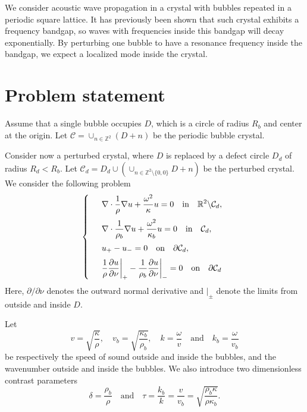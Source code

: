 \documentclass[a4paper]{article}
\author{Erik Orvehed Hiltunen}
\theoremstyle{definition}
\newcommand{\Z}{\mathbb{Z}}
\newcommand{\R}{\mathbb{R}}
\newcommand{\C}{\mathcal{C}}
\newcommand{\ds}{\displaystyle}
\def\nm{\noalign{\medskip}}
\begin{document}
We consider acoustic wave propagation in a crystal with bubbles repeated in a periodic square lattice. It has previously been shown that such crystal exhibits a frequency bandgap, so waves with frequencies inside this bandgap will decay exponentially. By perturbing one bubble to have a resonance frequency inside the bandgap, we expect a localized mode inside the crystal. 


\section{Problem statement}
Assume that a single bubble occupies $D$, which is a circle of radius $R_b$ and center at the origin. Let $\C = \cup_{n\in\Z^2}(D+n)$ be the periodic bubble crystal.

Consider now a perturbed crystal, where $D$ is replaced by a defect circle $D_d$ of radius $R_d < R_b$. Let $\C_d = D_d \cup \left( \cup_{n\in\Z^2\setminus\{0,0\}} D+n \right)$ be the perturbed crystal. We consider the following problem
\begin{equation} \label{eq:scattering}
\left\{
\begin{array} {ll}
	&\ds \nabla \cdot \frac{1}{\rho} \nabla  u+ \frac{\omega^2}{\kappa} u  = 0 \quad \text{in} \quad \R^2 \backslash \C_d, \\
	\nm
	&\ds \nabla \cdot \frac{1}{\rho_b} \nabla  u+ \frac{\omega^2}{\kappa_b} u  = 0 \quad \text{in} \quad \C_d, \\
	\nm
	&\ds  u_{+} -u_{-}  =0   \quad \text{on} \quad \partial \C_d, \\
	\nm
	& \ds  \frac{1}{\rho} \frac{\partial u}{\partial \nu} \bigg|_{+} - \frac{1}{\rho_b} \frac{\partial u}{\partial \nu} \bigg|_{-} =0 \quad \text{on} \quad \partial \C_d
\end{array}
\right.
\end{equation}
Here, $\partial/\partial \nu$ denotes the outward normal derivative and $|_\pm$ denote the limits from outside and inside $D$.  

Let
\begin{equation*} %
v = \sqrt{\frac{\kappa}{\rho}}, \quad v_b = \sqrt{\frac{\kappa_b}{\rho_b}}, \quad k= \frac{\omega}{v} \quad \text{and} \quad k_b= \frac{\omega}{v_b}
\end{equation*}
be respectively the speed of sound outside and inside the bubbles, and the wavenumber outside and inside the bubbles. We also introduce two dimensionless contrast parameters
\begin{equation*} %
\delta = \frac{\rho_b}{\rho} \quad \text{and} \quad \tau= \frac{k_b}{k}= \frac{v}{v_b} =\sqrt{\frac{\rho_b \kappa}{\rho \kappa_b}}. 
\end{equation*}
\end{document}
